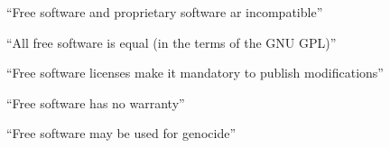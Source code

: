 
\begin{frame}

\begin{center}
\huge{``Free software and proprietary software ar incompatible''}
\end{center}

\end{frame}



\begin{frame}

\begin{center}
\huge{``All free software is equal (in the terms of the GNU GPL)''}
\end{center}

\end{frame}



\begin{frame}

\begin{center}
\huge{``Free software licenses make it mandatory to publish modifications''}
\end{center}

\end{frame}



\begin{frame}

\begin{center}
\huge{``Free software has no warranty''}
\end{center}

\end{frame}



\begin{frame}

\begin{center}
\huge{``Free software may be used for genocide''}
\end{center}

\end{frame}



